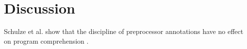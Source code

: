 \chapter{Discussion}
Schulze et al. show that the discipline of preprocessor annotations have no effect on program comprehension \cite{schulze2013discipline}.

